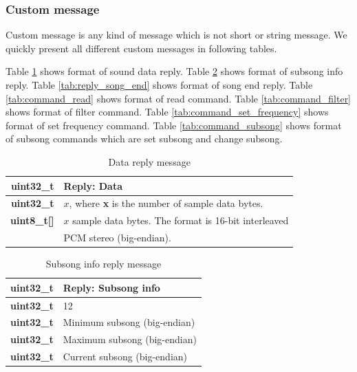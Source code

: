 \documentclass{article}
\begin{document}
\subsubsection{Custom message}

Custom message is any kind of message which is not short or string message.
We quickly present all different custom messages in following tables.

Table \ref{tab:reply_data} shows format of sound data reply.
Table \ref{tab:reply_subsong_info} shows format of subsong info reply.
Table \ref{tab:reply_song_end} shows format of song end reply.
Table \ref{tab:command_read} shows format of read command.
Table \ref{tab:command_filter} shows format of filter command.
Table \ref{tab:command_set_frequency} shows format of set frequency command.
Table \ref{tab:command_subsong} shows format of subsong commands
which are set subsong and change subsong.

\begin{table}
\begin{center}
\caption{Data reply message}
\label{tab:reply_data}
\begin{tabular}{|r|l|}
\hline
\textbf{uint32\_t} & Reply: Data \\
\hline
\textbf{uint32\_t} & $x$, where \textbf{x} is the number of sample
data bytes.\\
\hline
\textbf{uint8\_t[]} & $x$ sample data bytes. The format is 16-bit interleaved\\
& PCM stereo (big-endian).\\
\hline
\end{tabular}
\end{center}
\end{table}

\begin{table}
\begin{center}
\caption{Subsong info reply message}
\label{tab:reply_subsong_info}
\begin{tabular}{|r|l|}
\hline
\textbf{uint32\_t} & Reply: Subsong info \\
\hline
\textbf{uint32\_t} & 12\\
\hline
\textbf{uint32\_t} & Minimum subsong (big-endian)\\
\hline
\textbf{uint32\_t} & Maximum subsong (big-endian)\\
\hline
\textbf{uint32\_t} & Current subsong (big-endian)\\
\hline
\end{tabular}
\end{center}
\end{table}
\end{document}
